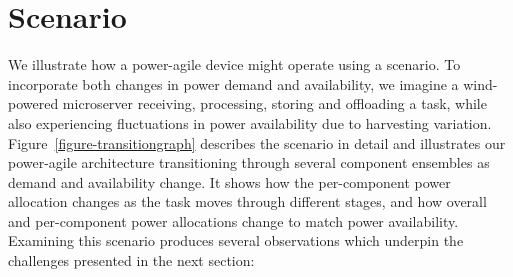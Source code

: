 \section{Scenario}
\label{section-scenario}



We illustrate how a power-agile device might operate using a scenario. To
incorporate both changes in power demand and availability, we imagine a
wind-powered microserver receiving, processing, storing and offloading a
task, while also experiencing fluctuations in power availability due to
harvesting variation. Figure~\ref{figure-transitiongraph} describes the
scenario in detail and illustrates our power-agile architecture transitioning
through several component ensembles as demand and availability change. It
shows how the per-component power allocation changes as the task moves
through different stages, and how overall and per-component power allocations
change to match power availability. Examining this scenario produces several
observations which underpin the challenges presented in the next section:

